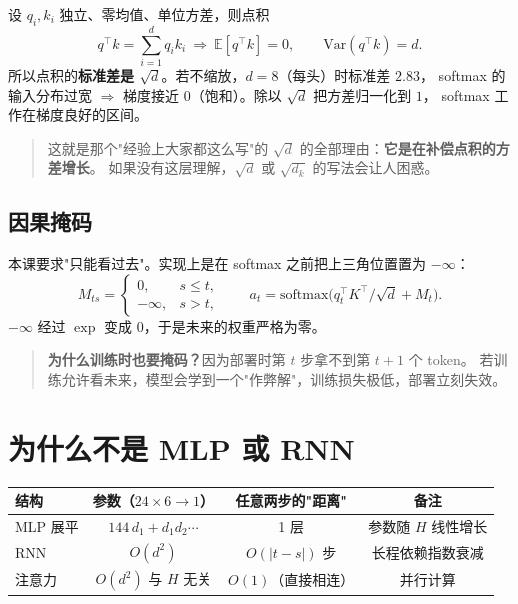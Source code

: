 设 $q_i,k_i$ 独立、零均值、单位方差，则点积
\begin{equation}
  q^\top k=\sum_{i=1}^{d} q_ik_i
  \ \Rightarrow\ \mathbb{E}[q^\top k]=0,\qquad
  \mathrm{Var}(q^\top k)=d .
\end{equation}
所以点积的\textbf{标准差是 $\sqrt d$}。若不缩放，$d=8$（每头）时标准差 $2.83$，
softmax 的输入分布过宽 $\Rightarrow$ 梯度接近 $0$（饱和）。除以 $\sqrt d$ 把方差归一化到 $1$，
softmax 工作在梯度良好的区间。

\begin{quote}
这就是那个"经验上大家都这么写"的 $\sqrt d$ 的全部理由：\textbf{它是在补偿点积的方差增长}。
如果没有这层理解，$\sqrt{d}$ 或 $\sqrt{d_k}$ 的写法会让人困惑。
\end{quote}

\subsection{因果掩码}

本课要求"只能看过去"。实现上是在 softmax 之前把上三角位置置为 $-\infty$：
\begin{equation}
  M_{ts}=\begin{cases}0,& s\le t,\\ -\infty,& s>t,\end{cases}
  \qquad
  a_t=\mathrm{softmax}\big(q_t^\top K^\top/\sqrt d+M_t\big).
\end{equation}
$-\infty$ 经过 $\exp$ 变成 $0$，于是未来的权重严格为零。

\begin{quote}
\textbf{为什么训练时也要掩码？}因为部署时第 $t$ 步拿不到第 $t+1$ 个 token。
若训练允许看未来，模型会学到一个"作弊解"，训练损失极低，部署立刻失效。
\end{quote}

\section{为什么不是 MLP 或 RNN}

\begin{center}
\small
\begin{tabular}{@{}lccc@{}}
\toprule
结构 & 参数（$24\times6\to1$） & 任意两步的"距离" & 备注 \\
\midrule
MLP 展平 & $144\,d_1+d_1d_2\cdots$ & 1 层 & 参数随 $H$ 线性增长 \\
RNN & $O(d^2)$ & $O(|t-s|)$ 步 & 长程依赖指数衰减 \\
注意力 & $O(d^2)$ 与 $H$ 无关 & $O(1)$（直接相连） & 并行计算 \\
\bottomrule
\end{tabular}
\end{center}

